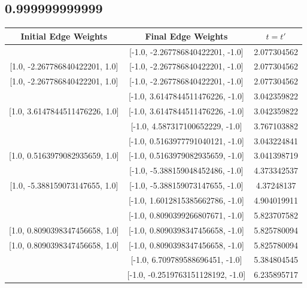 \documentclass[aps]{revtex4-2}
\begin{document}
\subsection{0.999999999999}
\begin{center}
    \begin{tabular}{||c c c||}
        \hline
        Initial Edge Weights&Final Edge Weights&$t=t'$\\
        \hline
        [1.0, -2.267786840422201, 1.0]&[-1.0, -2.267786840422201, -1.0]&2.077304562\\

        [1.0, -2.267786840422201, 1.0]&[-1.0, -2.267786840422201, -1.0]&2.077304562\\

        [1.0, -2.267786840422201, 1.0]&[-1.0, -2.267786840422201, -1.0]&2.077304562\\
        \hline
        [1.0, 3.6147844511476226, 1.0]&[-1.0, 3.6147844511476226, -1.0]&3.042359822\\

        [1.0, 3.6147844511476226, 1.0]&[-1.0, 3.6147844511476226, -1.0]&3.042359822\\
        \hline
        [1.0, 4.587317100652229, 1.0]&[-1.0, 4.587317100652229, -1.0]&3.767103882\\
        \hline
        [1.0, 0.5163977791040121, 1.0]&[-1.0, 0.5163977791040121, -1.0]&3.043224841\\
        
        [1.0, 0.5163979082935659, 1.0]&[-1.0, 0.5163979082935659, -1.0]&3.041398719\\
        \hline
        [1.0, -5.388159048452486, 1.0]&[-1.0, -5.388159048452486, -1.0]&4.373342537\\

        [1.0, -5.388159073147655, 1.0]&[-1.0, -5.388159073147655, -1.0]&4.37248137\\
        \hline
        [1.0, 1.6012815385662786, 1.0]&[-1.0, 1.6012815385662786, -1.0]&4.904019911\\
        \hline
        [1.0, 0.8090399266807671, 1.0]&[-1.0, 0.8090399266807671, -1.0]&5.823707582\\

        [1.0, 0.8090398347456658, 1.0]&[-1.0, 0.8090398347456658, -1.0]&5.825780094\\

        [1.0, 0.8090398347456658, 1.0]&[-1.0, 0.8090398347456658, -1.0]&5.825780094\\
        \hline
        [1.0, 6.709789588696451, 1.0]&[-1.0, 6.709789588696451, -1.0]&5.384804545\\
        \hline
        [1.0, -0.2519763151128192, 1.0]&[-1.0, -0.2519763151128192, -1.0]&6.235895717\\
        \hline
    \end{tabular}
\end{center}
\end{document}
